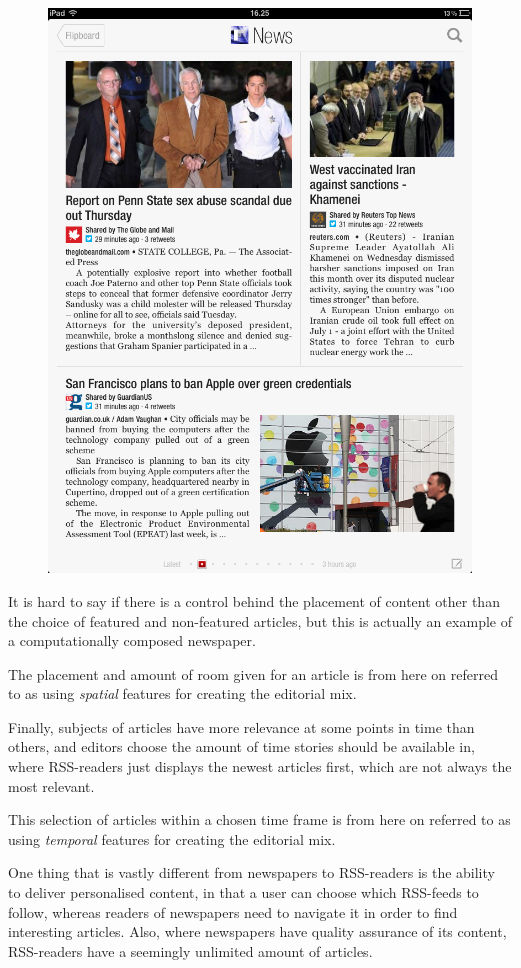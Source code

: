 \begin{figure}[h!tp]
 	\begin{center}
 		\includegraphics[width=.45\textwidth]{img/flipboard2}
 	\end{center}
\end{figure}

It is hard to say if there is a control behind the placement of content other than the choice of featured and non-featured articles, but this is actually an example of a computationally composed newspaper. 

The placement and amount of room given for an article is from here on referred to as using \emph{spatial} features for creating the editorial mix.

Finally, subjects of articles have more relevance at some points in time than others, and editors choose the amount of time stories should be available in, where RSS-readers just displays the newest articles first, which are not always the most relevant.

This selection of articles within a chosen time frame is from here on referred to as using \emph{temporal} features for creating the editorial mix.

One thing that is vastly different from newspapers to RSS-readers is the ability to deliver personalised content, in that a user can choose which RSS-feeds to follow, whereas readers of newspapers need to navigate it in order to find interesting articles. Also, where newspapers have quality assurance of its content, RSS-readers have a seemingly unlimited amount of articles.

